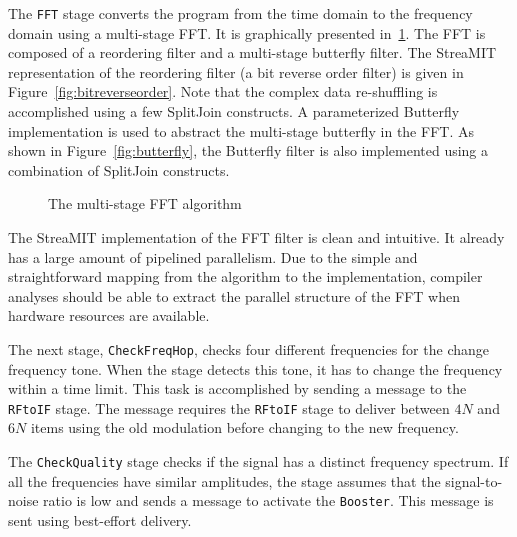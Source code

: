 The {\tt FFT} stage converts the program from the time domain to the
frequency domain using a multi-stage FFT. It is graphically presented
in~\ref{fig:fftfilter}. The FFT is composed of a reordering filter and
a multi-stage butterfly filter. The StreaMIT representation of the
reordering filter (a bit reverse order filter) is given in
Figure~\ref{fig:bitreverseorder}. Note that the complex data
re-shuffling is accomplished using a few SplitJoin constructs.  A
parameterized Butterfly implementation is used to abstract the
multi-stage butterfly in the FFT. As shown in
Figure~\ref{fig:butterfly}, the Butterfly filter is also implemented
using a combination of SplitJoin constructs.

\begin{figure}[t]
\centering
{}
\caption{The multi-stage FFT algorithm}
\vspace{-12pt}
\label{fig:fftfilter}
\end{figure}

The StreaMIT implementation of the FFT filter is clean and
intuitive. It already has a large amount of pipelined parallelism. Due
to the simple and straightforward mapping from the algorithm to the
implementation, compiler analyses should be able to extract the
parallel structure of the FFT when hardware resources are available.

The next stage, {\tt CheckFreqHop}, checks four different frequencies
for the change frequency tone. When the stage detects this tone, it
has to change the frequency within a time limit. This task is
accomplished by sending a message to the {\tt RFtoIF} stage.  The
message requires the {\tt RFtoIF} stage to deliver between $4N$ and
$6N$ items using the old modulation before changing to the new
frequency.

The {\tt CheckQuality} stage checks if the signal has a distinct
frequency spectrum. If all the frequencies have similar amplitudes,
the stage assumes that the signal-to-noise ratio is low and sends a
message to activate the {\tt Booster}. This message is sent using
best-effort delivery.

